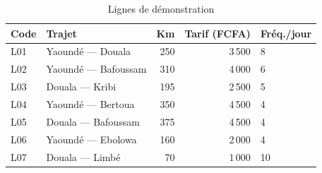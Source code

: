 \documentclass[12pt,a4paper]{report}
\begin{document}
\begin{table}[h!]
\centering
\caption{Lignes de démonstration}
\begin{tabular}{llrrl}
\toprule
\textbf{Code} & \textbf{Trajet} & \textbf{Km} & \textbf{Tarif (FCFA)} & \textbf{Fréq./jour} \\
\midrule
L01 & Yaoundé — Douala    & 250 & 3\,500 & 8 \\
L02 & Yaoundé — Bafoussam & 310 & 4\,000 & 6 \\
L03 & Douala — Kribi      & 195 & 2\,500 & 5 \\
L04 & Yaoundé — Bertoua   & 350 & 4\,500 & 4 \\
L05 & Douala — Bafoussam  & 375 & 4\,500 & 4 \\
L06 & Yaoundé — Ebolowa   & 160 & 2\,000 & 4 \\
L07 & Douala — Limbé      &  70 & 1\,000 & 10 \\
\bottomrule
\end{tabular}
\end{table}
\end{document}
